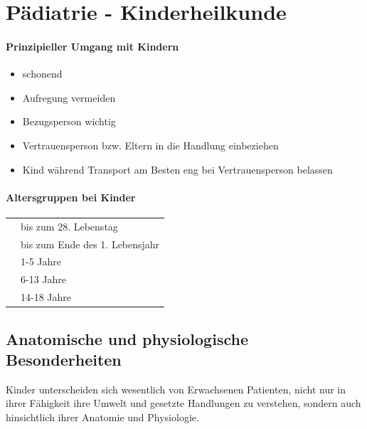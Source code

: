 \section{Pädiatrie - Kinderheilkunde}

\paragraph{Prinzipieller Umgang mit Kindern}

\begin{itemize}
\item schonend
\item Aufregung vermeiden
\item Bezugsperson wichtig
\item Vertrauensperson bzw. Eltern in die Handlung einbeziehen
\item Kind während Transport am Besten eng bei Vertrauensperson belassen
\end{itemize}

\paragraph{Altersgruppen bei Kinder}

\cite{LPN3}

\begin{center}
\begin{tabulary}{12cm}{LL}\toprule
{} & bis zum 28. Lebenstag
\\\addlinespace
{} & bis zum Ende des 1. Lebensjahr
\\\addlinespace
{} & 1-5 Jahre
\\\addlinespace
{} & 6-13 Jahre
\\\addlinespace
{} & 14-18 Jahre
\\\bottomrule
\end{tabulary}
\end{center}


\subsection{Anatomische und physiologische  Besonderheiten}

Kinder unterscheiden sich wesentlich von Erwachsenen Patienten, nicht nur in
ihrer Fähigkeit ihre Umwelt und gesetzte Handlungen zu verstehen, sondern auch
hinsichtlich ihrer Anatomie und Physiologie. 


